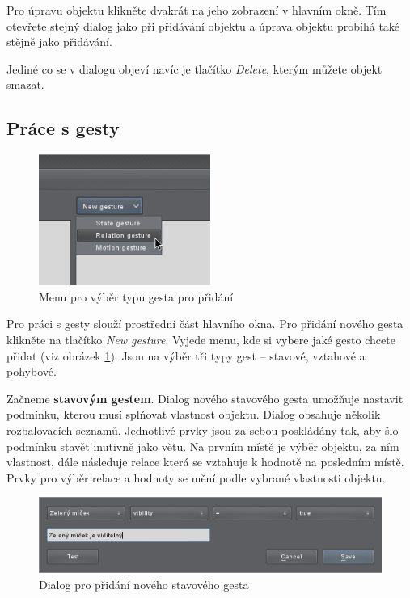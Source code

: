 Pro úpravu objektu klikněte dvakrát na jeho zobrazení v hlavním okně. Tím
otevřete stejný dialog jako při přidávání objektu a úprava objektu probíhá
také stějně jako přidávání.

Jediné co se v dialogu objeví navíc je tlačítko
\emph{Delete}, kterým můžete objekt smazat. 

\subsection{Práce s gesty}

\begin{figure}[h]
\centering
\includegraphics[width=0.5\textwidth]{newgesturemenu.png}
\caption{Menu pro výběr typu gesta pro přidání}
\label{fig:newgesturemenu}
\end{figure}

Pro práci s gesty slouží prostřední část hlavního okna. Pro přidání nového
gesta klikněte na tlačítko \emph{New gesture}. Vyjede menu, kde si vybere jaké
gesto chcete přidat (viz obrázek \ref{fig:newgesturemenu}). Jsou na výběr tři
typy gest -- stavové, vztahové a pohybové.

Začneme \textbf{stavovým gestem}. Dialog nového stavového gesta umožňuje nastavit
podmínku, kterou musí splňovat vlastnost objektu. Dialog obsahuje několik
rozbalovacích seznamů. Jednotlivé prvky jsou za sebou poskládány tak, aby šlo
podmínku stavět inutivně jako větu. Na prvním místě je výběr objektu, za ním
vlastnost, dále následuje relace která se vztahuje k hodnotě na posledním
místě. Prvky pro výběr relace a hodnoty se mění podle vybrané vlastnosti
objektu.

\begin{figure}[h]
\centering
\includegraphics[width=1.1\textwidth]{newstategesture.png}
\caption{Dialog pro přidání nového stavového gesta}
\label{fig:newstategesture}
\end{figure}

